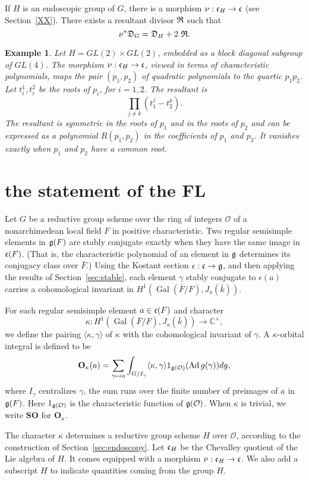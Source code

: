 \documentclass[brochure,english,12pt]{bourbaki}
\newtheorem{example}[equation]{Example}
\def\op#1{{\operatorname{#1}}}
\newcommand{\ring}[1]{\mathbb{#1}}
\def\SO{{\mathbf {SO}}}
\def\OO{{\mathbf O}}
\def\g{\frak{g}}
\def\cc{\frak{c}}
\def\DIV{{\frak{D}}}
\def\RDIV{{\frak{R}}}
\def\O{{\mathcal O}}
\begin{document}
If $H$ is an endoscopic group of $G$, there is a morphism $\nu:\cc_H\to \cc$ (see Section~\ref{XX}).  There exists
a resultant divisor $\RDIV$ such that
\[
\nu^*\DIV_G = \DIV_H + 2\,\, \RDIV.
\]

\begin{example} Let $H=GL(2)\times GL(2)$, embedded as a block
  diagonal subgroup of $GL(4)$.  The morphism $\nu:\cc_H\to \cc$,
  viewed in terms of characteristic polynomials, maps the pair
  $(p_1,p_2)$ of quadratic polynomials to the quartic $p_1p_2$.  Let
  $t^1_i,t^2_i$ be the roots of $p_i$, for $i=1,2$.  The resultant is
\[
\prod_{j\ne k} (t^j_1 - t^k_2).
\]
  The
resultant is symmetric in the roots of $p_1$ and in the roots of $p_2$
and can be expressed as a polynomial $R(p_1,p_2)$ in the coefficients
of $p_1$ and $p_2$.  It vanishes exactly when $p_1$ and $p_2$ have a common root.
\end{example}



\section{the statement of the FL}\label{sec:statement}

Let $G$ be a reductive group scheme over the ring of integers $\O$ of
a nonarchimedean local field $F$ in positive characteristic.  Two
regular semisimple elements in $\g(F)$ are stably conjugate exactly
when they have the same image in $\cc(F)$.  (That is, the
characteristic polynomial of an element in $\g$ determines its
conjugacy class over $\bar F$.)  Using the Kostant section
$\epsilon:\cc\to\g$, and then applying the results of
Section~\ref{sec:stable}, each element $\gamma$ stably conjugate to
$\epsilon(a)$ carries a cohomological invariant in $H^1(\op{Gal}(\bar
F/F),J_a(\bar k))$.

For each regular semisimple element $a\in \cc(F)$ and character 
\[
\kappa:H^1(\op{Gal}(\bar F/F),J_a(\bar k))\to\ring{C}^\times,
\]
we define the pairing
 $\langle\kappa,\gamma\rangle$
of $\kappa$ with the cohomological invariant of $\gamma$.
A 
$\kappa$-orbital integral is defined to be
\[
\OO_\kappa(a) = \sum_ {\gamma\mapsto a} 
\int_{G/I_\gamma} \langle\kappa,\gamma\rangle 1_{\g(\O)} (\op{Ad}\, g(\gamma)) dg,
\]
where $I_\gamma$ centralizes $\gamma$, the sum runs over the finite
number of preimages of $a$ in $\g(F)$.  Here $1_{\g(\O)}$ is the
characteristic function of $\g(\O)$.  When $\kappa$ is trivial, we
write $\SO$ for $\OO_\kappa$.

The character $\kappa$ determines a reductive group scheme $H$ over $\O$,
according to the construction of Section~\ref{sec:endoscopy}.
  Let $\cc_H$ be the
Chevalley quotient of the Lie algebra of $H$.  It comes equipped with a morphism $\nu:\cc_H\to\cc$.
We also add a subscript $H$ to indicate
quantities coming from the group $H$.
\end{document}
